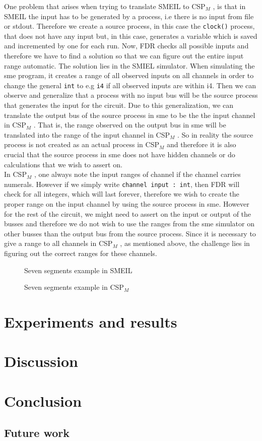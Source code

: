 \documentclass[a4paper]{report}
\newcommand{\cspm}{CSP$_M$ }
\begin{document}
One problem that arises when trying to translate SMEIL to \cspm, is that in SMEIL the input has to be generated by a process, i.e there is no input from file or stdout. 
Therefore we create a source process, in this case the \texttt{clock()} process, that does not have any input but, in this case, generates a variable which is saved and incremented by one for each run.
Now, FDR checks all possible inputs and therefore we have to find a solution so that we can figure out the entire input range automatic. 
The solution lies in the SMIEL simulator. 
When simulating the sme program, it creates a range of all observed inputs on all channels in order to change the general \texttt{int} to e.g \texttt{i4} if all observed inputs are within i4. 
Then we can observe and generalize that a process with no input bus will be the source process that generates the input for the circuit.
Due to this generalization, we can translate the output bus of the source process in sme to be the the input channel in \cspm. 
That is, the range observed on the output bus in sme will be translated into the range of the input channel in \cspm. 
So in reality the source process is not created as an actual process in \cspm and therefore it is also crucial that the source process in sme does not have hidden channels or do calculations that we wish to assert on. \\ 
In \cspm, one always note the input ranges of channel if the channel carries numerals. However if we simply write \texttt{channel input : int}, then FDR will check for all integers, which will last forever, therefore we wish to create the proper range on the input channel by using the source process in sme. 
However for the rest of the circuit, we might need to assert on the input or output of the busses and therefore we do not wish to use the ranges from the sme simulator on other busses than the output bus from the source process.
Since it is necessary to give a range to all channels in \cspm, as mentioned above, the challenge lies in figuring out the correct ranges for these channels. \\

\begin{figure}
\label{seven_segments_exaple.sme}
\caption{Seven segments example in SMEIL}
\end{figure}


\begin{figure}
\label{seven_segments_exaple.csp}
\caption{Seven segments example in \cspm}
\end{figure}



\chapter{Experiments and results}
\chapter{Discussion}

\chapter{Conclusion}
\section{Future work}

\newpage


\end{document}
